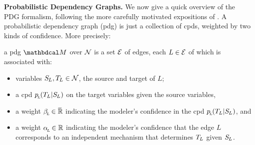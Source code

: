 \documentclass[twoside]{article}
\begin{document}

\textbf{Probabilistic Dependency Graphs.}
We now give a quick overview of the PDG formalism,
following the more carefully motivated
expositions of \textcite{pdg-aaai,one-true-loss}.
%
%
A probabilistic dependency graph (pdg) is just a collection of cpds, weighted by two kinds of confidence. More precisely:

\begin{defn}
    a pdg $\dg M
    $
    over $\mathcal N$ is a set $\mathcal E$ of edges, 
    each $L \in \mathcal E$ of which is associated with:
    \begin{itemize}[nosep]
        \item variables $\Src L, \Tgt L \in \N$, the source and target of $L$;
        \item a cpd $p\ssub L (\Tgt L | \Src L)$ on the target variables given the source variables,
        \item a weight $\beta_{\!_{L}\!} \in \mskip1mu\overline{\mskip-1mu\mathbb R\!}\,$ indicating 
            the modeler's confidence in the cpd $p\ssub L(\Tgt L | \Src L)$, and 
        \item a weight $\alpha_{\!_{L}\!} \in \mathbb R$ indicating 
            the modeler's confidence that the edge $L$ corresponds to an independent mechanism that determines $\Tgt L$ given $\Src L$. 
        \qedhere
    \end{itemize}
\end{defn}
\end{document}
